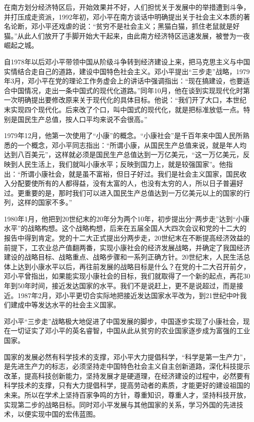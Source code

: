 \documentclass[cs4size,a4paper,nofonts,twoside]{ctexart}
\begin{document}
在南方划分经济特区后，开始效果并不好，人们担忧关于发展中的举措遭到斗争，并打压成走资派，1992年初，邓小平在南方谈话中明确提出关于社会主义本质的著名论断，邓小平还戏虐的说：“贫穷不是社会主义；黑猫白猫，抓住老鼠就是好猫。”从此人们放开了手脚开始大干起来，由此南方经济特区迅速发展，被誉为一夜崛起之城。

自1978年以后邓小平带领中国从阶级斗争转到经济建设上来，把马克思主义与中国实情结合走自己的道路，建设中国特色社会主义。邓小平提出“三步走”战略，1979年3月，邓小平在党的理论工作务虚会上的讲话中强调指出：“现在搞建设，也要适合中国情况，走出一条中国式的现代化道路。”同年10月，他在谈到实现现代化时第一次明确提出要修改原来关于现代化的具体目标。他说：“我们开了大口，本世纪末实现四个现代化。后来改了个口，叫中国式的现代化，就是把标准放低一点。特别是国民生产总值，按人口平均来说不会很高。”

1979年12月，他第一次使用了“小康”的概念。“小康社会”是千百年来中国人民所熟悉的一个概念，邓小平同志指出：“所谓小康，从国民生产总值来说，就是年人均达到八百美元”，这样就必须是国民生产总值达到一万亿美元，“这一万亿美元，反映到人民生活上，我们就叫小康水平；反映到国力上，就是较强国家”。他指出：“所谓小康社会，就是虽不富裕，但日子好过。我们是社会主义国家，国民收入分配要使所有的人都得益，没有太富的人，也没有太穷的人，所以日子普遍好过。更重要的是，那时我们可以进入国民生产总值达到一万亿美元以上的国家的行列，这样的国家不多。”

1980年1月，他把到20世纪末的20年分为两个10年，初步提出分“两步走”达到“小康水平”的战略构想。这个战略构想，后来在五届全国人大四次会议和党的十二大的报告中得到肯定。党的十二大正式提出分两步走，20世纪末在不断提高经济效益的前提下，工农业总产值翻两番，实现小康社会的经济发展战略，并确定了我国经济建设的战略目标、战略重点、战略步骤和一系列正确方针。20世纪末，人民生活总体上达到小康水平以后，再往前发展的战略目标是什么？在党的十二大召开前夕，邓小平曾指出，如果能实现小康社会的目标，我们就取得了一个新的起点，再花30年到50年时间，接近发达国家的水平。我们不是说赶上，更不是说超过，而是接近。1987年2月，邓小平更切合实际地把接近发达国家水平改为，到21世纪中叶我们建成中等发达水平的社会主义国家。

邓小平“三步走”战略极大地促进了中国发展的脚步，中国逐步实现了小康社会，现在一切证实了邓小平的英名睿智，中国从此从贫穷的农业国家逐步成为富强的工业国家。

国家的发展必然有科学技术的支撑，邓小平大力提倡科学，“科学是第一生产力”，是先进生产力的标志，必须坚持走中国特色社会主义自主创新道路，深化科技提示改革，提高科技创新能力，坚持发展才是硬道理，在经济建设的过程中，必然要有科学技术的支撑，只有大力提倡科学，提高劳动者的素质，才能更好的建设祖国的未来。所以在学术上坚持百家争鸣的方针，尊重知识，尊重人才，坚持科技开放，实现第二步的战略目标。同时邓小平发展与其他国家的关系，学习外国的先进技术，以便实现中国的宏伟蓝图。
\end{document}
